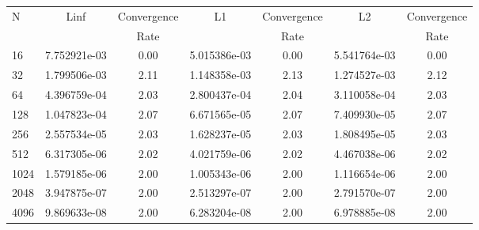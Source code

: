 \documentclass[12pt]{article}
\begin{document}
	\begin{tabular}{l|c|c|c|c|c|c}
		N&Linf&Convergence&L1&Convergence&L2&Convergence\\
		&&Rate&&Rate&&Rate\\
		\hline
		16&7.752921e-03&0.00&5.015386e-03&0.00&5.541764e-03&0.00\\
		\hline
		32&1.799506e-03&2.11&1.148358e-03&2.13&1.274527e-03&2.12\\
		\hline
		64&4.396759e-04&2.03&2.800437e-04&2.04&3.110058e-04&2.03\\
		\hline
		128&1.047823e-04&2.07&6.671565e-05&2.07&7.409930e-05&2.07\\
		\hline
		256&2.557534e-05&2.03&1.628237e-05&2.03&1.808495e-05&2.03\\
		\hline
		512&6.317305e-06&2.02&4.021759e-06&2.02&4.467038e-06&2.02\\
		\hline
		1024&1.579185e-06&2.00&1.005343e-06&2.00&1.116654e-06&2.00\\
		\hline
		2048&3.947875e-07&2.00&2.513297e-07&2.00&2.791570e-07&2.00\\
		\hline
		4096&9.869633e-08&2.00&6.283204e-08&2.00&6.978885e-08&2.00\\
	\end{tabular}
\end{document}
